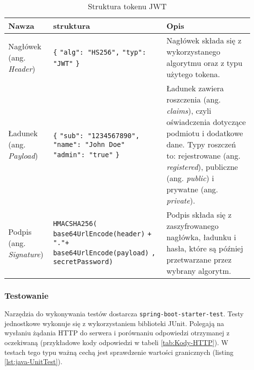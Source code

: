 \begin{longtable}{|p{3cm}|p{5cm}|p{6cm}|}
		\caption{Struktura tokenu JWT \cite{JWT}}
		\label{tab:JWT} \\
\hline
\textbf{Nawza} & \textbf{struktura} & \textbf{Opis} \\ \hline

Nagłówek (ang. \textit{Header}) &
 \texttt{\{} \newline
 \hspace*{1em}\texttt{"alg": "HS256",} \newline
 \hspace*{1em}\texttt{"typ": "JWT"} \newline
 \texttt{\}} & 
 Nagłówek składa się z wykorzystanego algorytmu oraz z typu użytego tokena. \\ \hline
 Ładunek (ang. \textit{Payload}) &
  \texttt{\{} \newline
 \hspace*{1em}\texttt{"sub": "1234567890",} \newline
 \hspace*{1em}\texttt{"name": "John Doe"} \newline
 \hspace*{1em}\texttt{"admin": "true"} \newline
 \texttt{\}} & 
 Ładunek zawiera roszczenia (ang. \textit{claims}), czyli oświadczenia dotyczące podmiotu i dodatkowe dane. Typy roszczeń to: rejestrowane (ang. \textit{registered}), publiczne (ang. \textit{public}) i prywatne (ang. \textit{private}).
 \\ \hline
  Podpis (ang. \textit{Signature}) &
\texttt{HMACSHA256(} \newline
 \hspace*{1em}\texttt{base64UrlEncode(header)} \newline
 \hspace*{1em}\texttt{+ "."\space +} \newline
 \hspace*{1em}\texttt{base64UrlEncode(payload)} \newline
 \hspace*{1em}\texttt{, secretPassword)} &
  Podpis składa się z zaszyfrowanego nagłówka, ładunku i hasła, które są później przetwarzane przez wybrany algorytm. 
 \\ \hline

\end{longtable}

\subsubsection*{Testowanie}
Narzędzia do wykonywania testów dostarcza \texttt{spring-boot-starter-test}. Testy jednostkowe wykonuje się z wykorzystaniem biblioteki JUnit. Polegają na wysłaniu żądania HTTP do serwera i porównaniu odpowiedzi otrzymanej z oczekiwaną (przykładowe kody odpowiedzi w tabeli \ref{tab:Kody-HTTP}). W testach tego typu ważną cechą jest sprawdzenie wartości granicznych (listing \ref{lst:java-UnitTest}). 


